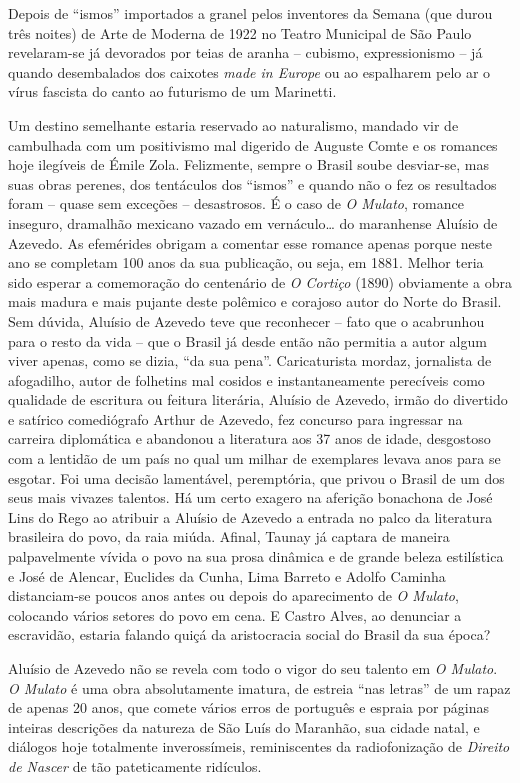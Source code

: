 \documentclass[
  letterpaper,
  DIV=11,
  numbers=noendperiod]{scrreprt}
\begin{document}
Depois de ``ismos'' importados a granel pelos inventores da Semana (que
durou três noites) de Arte de Moderna de 1922 no Teatro Municipal de São
Paulo revelaram-se já devorados por teias de aranha -- cubismo,
expressionismo -- já quando desembalados dos caixotes \emph{made in
Europe} ou ao espalharem pelo ar o vírus fascista do canto ao futurismo
de um Marinetti.

Um destino semelhante estaria reservado ao naturalismo, mandado vir de
cambulhada com um positivismo mal digerido de Auguste Comte e os
romances hoje ilegíveis de Émile Zola. Felizmente, sempre o Brasil soube
desviar-se, mas suas obras perenes, dos tentáculos dos ``ismos'' e
quando não o fez os resultados foram -- quase sem exceções --
desastrosos. É o caso de \emph{O Mulato}, romance inseguro, dramalhão
mexicano vazado em vernáculo\ldots{} do maranhense Aluísio de Azevedo.
As efemérides obrigam a comentar esse romance apenas porque neste ano se
completam 100 anos da sua publicação, ou seja, em 1881. Melhor teria
sido esperar a comemoração do centenário de \emph{O Cortiço} (1890)
obviamente a obra mais madura e mais pujante deste polêmico e corajoso
autor do Norte do Brasil. Sem dúvida, Aluísio de Azevedo teve que
reconhecer -- fato que o acabrunhou para o resto da vida -- que o Brasil
já desde então não permitia a autor algum viver apenas, como se dizia,
``da sua pena''. Caricaturista mordaz, jornalista de afogadilho, autor
de folhetins mal cosidos e instantaneamente perecíveis como qualidade de
escritura ou feitura literária, Aluísio de Azevedo, irmão do divertido e
satírico comediógrafo Arthur de Azevedo, fez concurso para ingressar na
carreira diplomática e abandonou a literatura aos 37 anos de idade,
desgostoso com a lentidão de um país no qual um milhar de exemplares
levava anos para se esgotar. Foi uma decisão lamentável, peremptória,
que privou o Brasil de um dos seus mais vivazes talentos. Há um certo
exagero na aferição bonachona de José Lins do Rego ao atribuir a Aluísio
de Azevedo a entrada no palco da literatura brasileira do povo, da raia
miúda. Afinal, Taunay já captara de maneira palpavelmente vívida o povo
na sua prosa dinâmica e de grande beleza estilística e José de Alencar,
Euclides da Cunha, Lima Barreto e Adolfo Caminha distanciam-se poucos
anos antes ou depois do aparecimento de \emph{O Mulato}, colocando
vários setores do povo em cena. E Castro Alves, ao denunciar a
escravidão, estaria falando quiçá da aristocracia social do Brasil da
sua época?

Aluísio de Azevedo não se revela com todo o vigor do seu talento em
\emph{O Mulato}. \emph{O Mulato} é uma obra absolutamente imatura, de
estreia ``nas letras'' de um rapaz de apenas 20 anos, que comete vários
erros de português e espraia por páginas inteiras descrições da natureza
de São Luís do Maranhão, sua cidade natal, e diálogos hoje totalmente
inverossímeis, reminiscentes da radiofonização de \emph{Direito de
Nascer} de tão pateticamente ridículos.
\end{document}
